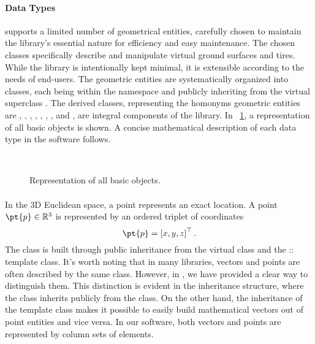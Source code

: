\paragraph{Data Types}
\Acme{} supports a limited number of geometrical entities, carefully chosen to maintain the library's essential nature for efficiency and easy maintenance. The chosen classes specifically describe and manipulate virtual ground surfaces and tires. While the library is intentionally kept minimal, it is extensible according to the needs of end-users. The geometric entities are systematically organized into classes, each being within the \Acme{} namespace and publicly inheriting from the virtual superclass \Entity{}. The derived classes, representing the homonyms geometric entities are \Point{}, \Line{}, \Ray{}, \Plane{}, \Segment{}, \Triangle{}, \Disk{}, and \Ball{}, are integral components of the library. In \figurename{}~\ref{app1:fig:acme_entities}, a representation of all \Acme{} basic \Entity{} objects is shown. A concise mathematical description of each data type in the software follows.

\begin{figure}[!ht]
  \centering
  \def\svgwidth{9cm}
   \\[1.0em]
  \def\svgwidth{9cm}
  
  \caption{Representation of all \Acme{} basic \Entity{} objects.}
  \label{app1:fig:acme_entities}
\end{figure}

\paragraph{\Point{}}
In the \ac{3D} Euclidean space, a point represents an exact location. A point $\pt{p} \in \mathbb{R}^3$ is represented by an ordered triplet of coordinates
%
\begin{equation*}
  \pt{p} = \left[x, y, z\right]^{\top} \text{.}
\end{equation*}
%
The \Point{} class is built through public inheritance from the virtual class \Entity{} and the \Eigen{}::\MatrixBase{} template class. It's worth noting that in many \cpp{} libraries, vectors and points are often described by the same class. However, in \Acme{}, we have provided a clear way to distinguish them. This distinction is evident in the inheritance structure, where the \Point{} class inherits publicly from the \Entity{} class. On the other hand, the inheritance of the \MatrixBase{} template class makes it possible to easily build mathematical vectors out of point entities and vice versa. In our software, both vectors and points are represented by column sets of elements.

